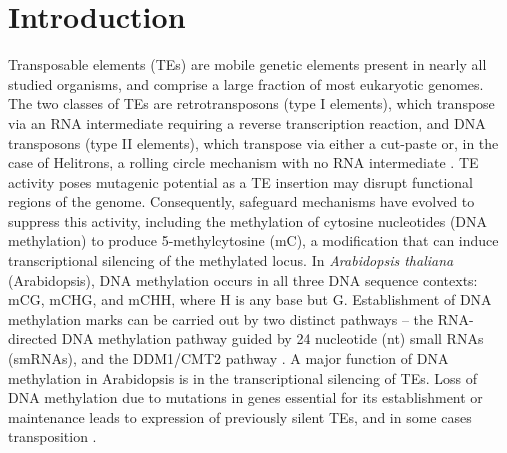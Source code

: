 \documentclass[12pt]{article}
\begin{document}
\pagebreak

\section{Introduction}

Transposable elements (TEs) are mobile genetic elements present in
nearly all studied organisms, and comprise a large fraction of most
eukaryotic genomes. The two classes of TEs are retrotransposons (type I
elements), which transpose via an RNA intermediate requiring a reverse
transcription reaction, and DNA transposons (type II elements), which
transpose via either a cut-paste or, in the case of Helitrons, a rolling
circle mechanism with no RNA intermediate \cite{Wicker:2007en}. TE
activity poses mutagenic potential as a TE insertion may disrupt
functional regions of the genome. Consequently, safeguard mechanisms
have evolved to suppress this activity, including the methylation of
cytosine nucleotides (DNA methylation) to produce 5-methylcytosine (mC),
a modification that can induce transcriptional silencing of the
methylated locus. In \emph{Arabidopsis thaliana }(Arabidopsis), DNA
methylation occurs in all three DNA sequence contexts: mCG, mCHG, and
mCHH, where H is any base but G. Establishment of DNA methylation marks
can be carried out by two distinct pathways -- the RNA-directed DNA
methylation pathway guided by 24 nucleotide (nt) small RNAs (smRNAs),
and the DDM1/CMT2 pathway \cite{Zemach:2013dj, Matzke:2014ek}. A major
function of DNA methylation in Arabidopsis is in the transcriptional
silencing of TEs. Loss of DNA methylation due to mutations in genes
essential for its establishment or maintenance leads to expression of
previously silent TEs, and in some cases transposition
\cite{Mirouze:2009km, Miura:2001eg, Saze:2003du, Lippman:2004cm, Jeddeloh:1999gu, Zemach:2013dj}.
\end{document}
